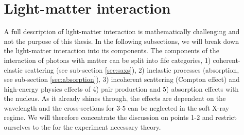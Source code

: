 \section{Light-matter interaction}\label{sec:light-matter-interaction}
A full description of light-matter interaction is mathematically challenging and not the purpose of this thesis. In the following subsections, we will break down the light-matter interaction into its components. The components of the interaction of photons with matter can be split into fife categories, 1) coherent-elastic scattering (see sub-section \ref{sec:saxs}), 2) inelastic processes (absorption, see sub-section \ref{sec:absorption}), 3) incoherent scattering (Compton effect) and high-energy physics effects of 4) pair production and 5) absorption effects with the nucleus. As it already shines through, the effects are dependent on the wavelength and the cross-sections for 3-5 can be neglected in the soft X-ray regime. We will therefore concentrate the discussion on points 1-2 and restrict ourselves to the for the experiment necessary theory.
%
%
%
